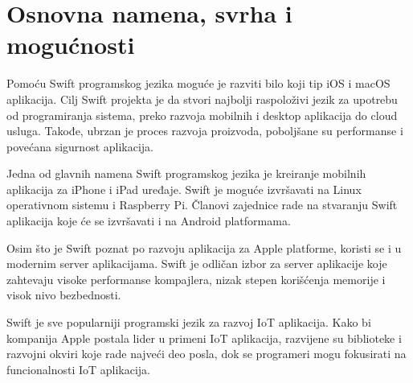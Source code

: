 \documentclass[a4paper]{article}
\begin{document}
\section{Osnovna namena, svrha i mogućnosti}	
\label{sec:drugiDeo}


Pomoću Swift programskog jezika moguće je razviti bilo koji tip iOS i macOS aplikacija. Cilj Swift projekta je da stvori najbolji raspoloživi jezik za upotrebu od programiranja sistema, preko razvoja mobilnih i desktop aplikacija do cloud usluga. Takođe, ubrzan je proces razvoja proizvoda, poboljšane su performanse i povećana sigurnost aplikacija.

Jedna od glavnih namena Swift programskog jezika je kreiranje mobilnih aplikacija za iPhone i iPad uređaje. Swift je moguće izvršavati na Linux operativnom sistemu i Raspberry Pi. Članovi zajednice rade na stvaranju Swift aplikacija koje će se izvršavati i na Android platformama.

Osim što je Swift poznat po razvoju aplikacija za Apple platforme, koristi se i u modernim server aplikacijama. Swift je odličan izbor za server aplikacije koje zahtevaju visoke performanse kompajlera, nizak stepen korišćenja memorije i visok nivo bezbednosti.

Swift je sve popularniji programski jezik za razvoj IoT aplikacija. Kako bi kompanija Apple postala lider u primeni IoT aplikacija, razvijene su biblioteke i razvojni okviri koje rade najveći deo posla, dok se programeri mogu fokusirati na funcionalnosti IoT aplikacija.
\end{document}
